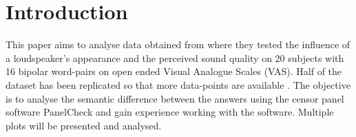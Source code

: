 \chapter*{Introduction}
\label{introduction}
This paper aims to analyse data obtained from \cite{Christiansen2011} where they tested the influence of a loudspeaker's appearance and the perceived sound quality on 20 subjects with 16 bipolar word-pairs on open ended Visual Analogue Scales (VAS). Half of the dataset has been replicated so that more data-points are available . The objective is to analyse the semantic difference between the answers using the censor panel software PanelCheck and gain experience working with the software. Multiple plots will be presented and analysed.